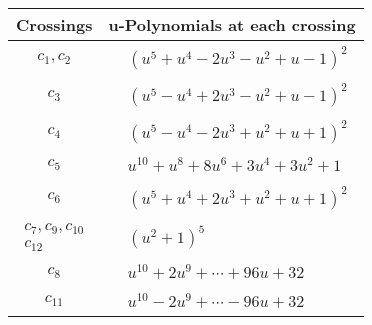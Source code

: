 \documentclass[1p]{elsarticle_modified}
\theoremstyle{definition}
\begin{document}
\begin{tabular}{m{50pt}|m{274pt}}
Crossings & \hspace{64pt}u-Polynomials at each crossing \\
\hline $$\begin{aligned}c_{1},c_{2}\end{aligned}$$&$\begin{aligned}
&(u^5+u^4-2 u^3- u^2+u-1)^2
\end{aligned}$\\
\hline $$\begin{aligned}c_{3}\end{aligned}$$&$\begin{aligned}
&(u^5- u^4+2 u^3- u^2+u-1)^2
\end{aligned}$\\
\hline $$\begin{aligned}c_{4}\end{aligned}$$&$\begin{aligned}
&(u^5- u^4-2 u^3+u^2+u+1)^2
\end{aligned}$\\
\hline $$\begin{aligned}c_{5}\end{aligned}$$&$\begin{aligned}
&u^{10}+u^8+8 u^6+3 u^4+3 u^2+1
\end{aligned}$\\
\hline $$\begin{aligned}c_{6}\end{aligned}$$&$\begin{aligned}
&(u^5+u^4+2 u^3+u^2+u+1)^2
\end{aligned}$\\
\hline $$\begin{aligned}c_{7},c_{9},c_{10}\\c_{12}\end{aligned}$$&$\begin{aligned}
&(u^2+1)^5
\end{aligned}$\\
\hline $$\begin{aligned}c_{8}\end{aligned}$$&$\begin{aligned}
&u^{10}+2 u^9+\cdots+96 u+32
\end{aligned}$\\
\hline $$\begin{aligned}c_{11}\end{aligned}$$&$\begin{aligned}
&u^{10}-2 u^9+\cdots-96 u+32
\end{aligned}$\\
\hline
\end{tabular}\\~\\
\end{document}
